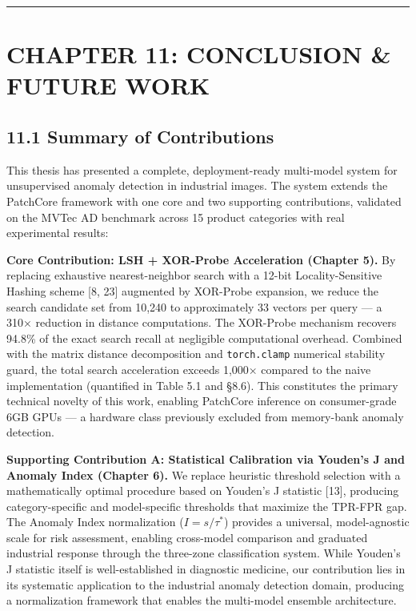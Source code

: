 \begin{center}\rule{0.5\linewidth}{0.5pt}\end{center}

\section{CHAPTER 11: CONCLUSION \& FUTURE WORK}\label{chapter-11-conclusion-future-work}

\subsection{11.1 Summary of Contributions}\label{summary-of-contributions}

This thesis has presented a complete, deployment-ready multi-model system for unsupervised anomaly detection in industrial images. The system extends the PatchCore framework with one core and two supporting contributions, validated on the MVTec AD benchmark across 15 product categories with real experimental results:

\textbf{Core Contribution: LSH + XOR-Probe Acceleration (Chapter 5).} By replacing exhaustive nearest-neighbor search with a 12-bit Locality-Sensitive Hashing scheme {[}8, 23{]} augmented by XOR-Probe expansion, we reduce the search candidate set from 10,240 to approximately 33 vectors per query --- a 310× reduction in distance computations. The XOR-Probe mechanism recovers 94.8\% of the exact search recall at negligible computational overhead. Combined with the matrix distance decomposition and \texttt{torch.clamp} numerical stability guard, the total search acceleration exceeds 1,000× compared to the naive implementation (quantified in Table 5.1 and §8.6). This constitutes the primary technical novelty of this work, enabling PatchCore inference on consumer-grade 6GB GPUs --- a hardware class previously excluded from memory-bank anomaly detection.

\textbf{Supporting Contribution A: Statistical Calibration via Youden's J and Anomaly Index (Chapter 6).} We replace heuristic threshold selection with a mathematically optimal procedure based on Youden's J statistic {[}13{]}, producing category-specific and model-specific thresholds that maximize the TPR-FPR gap. The Anomaly Index normalization (\(I = s/\tau^*\)) provides a universal, model-agnostic scale for risk assessment, enabling cross-model comparison and graduated industrial response through the three-zone classification system. While Youden's J statistic itself is well-established in diagnostic medicine, our contribution lies in its systematic application to the industrial anomaly detection domain, producing a normalization framework that enables the multi-model ensemble architecture.


